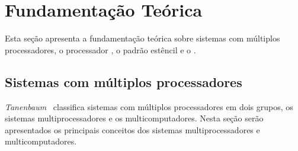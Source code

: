 
%


\chapter{Fundamentação Teórica}
\label{cap:fundamentacao_teorica}


Esta seção apresenta a fundamentação teórica sobre sistemas com múltiplos processadores, o processador \manycore \mppa, o padrão estêncil e o \fw \pskelmppa.

\section{Sistemas com múltiplos processadores}
\label{sec:multicpu}

\textit{Tanenbaum}~\cite{Tanenbaum:2014:MOS:2655363} classifica sistemas com múltiplos processadores em dois grupos, os sistemas multiprocessadores e os multicomputadores. Nesta seção serão apresentados os principais conceitos dos sistemas multiprocessadores e multicomputadores.

